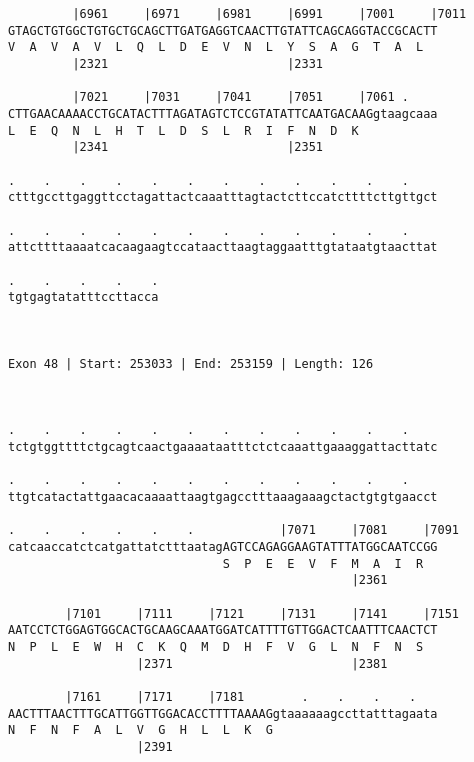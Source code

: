 \documentclass{article}
\begin{document}
\begin{Verbatim}
         |6961     |6971     |6981     |6991     |7001     |7011
GTAGCTGTGGCTGTGCTGCAGCTTGATGAGGTCAACTTGTATTCAGCAGGTACCGCACTT
V  A  V  A  V  L  Q  L  D  E  V  N  L  Y  S  A  G  T  A  L  
         |2321                         |2331                
  
         |7021     |7031     |7041     |7051     |7061 .    
CTTGAACAAAACCTGCATACTTTAGATAGTCTCCGTATATTCAATGACAAGgtaagcaaa
L  E  Q  N  L  H  T  L  D  S  L  R  I  F  N  D  K           
         |2341                         |2351                
  
.    .    .    .    .    .    .    .    .    .    .    .    
ctttgccttgaggttcctagattactcaaatttagtactcttccatcttttcttgttgct
                                                            
.    .    .    .    .    .    .    .    .    .    .    .    
attcttttaaaatcacaagaagtccataacttaagtaggaatttgtataatgtaacttat
                                                            
.    .    .    .    .
tgtgagtatatttccttacca
                     
                     
 
Exon 48 | Start: 253033 | End: 253159 | Length: 126



.    .    .    .    .    .    .    .    .    .    .    .    
tctgtggttttctgcagtcaactgaaaataatttctctcaaattgaaaggattacttatc
                                                            
.    .    .    .    .    .    .    .    .    .    .    .    
ttgtcatactattgaacacaaaattaagtgagcctttaaagaaagctactgtgtgaacct
                                                            
.    .    .    .    .    .            |7071     |7081     |7091
catcaaccatctcatgattatctttaatagAGTCCAGAGGAAGTATTTATGGCAATCCGG
                              S  P  E  E  V  F  M  A  I  R  
                                                |2361       
  
        |7101     |7111     |7121     |7131     |7141     |7151
AATCCTCTGGAGTGGCACTGCAAGCAAATGGATCATTTTGTTGGACTCAATTTCAACTCT
N  P  L  E  W  H  C  K  Q  M  D  H  F  V  G  L  N  F  N  S  
                  |2371                         |2381       
  
        |7161     |7171     |7181        .    .    .    .   
AACTTTAACTTTGCATTGGTTGGACACCTTTTAAAAGgtaaaaaagccttatttagaata
N  F  N  F  A  L  V  G  H  L  L  K  G                       
                  |2391                                     
  

\end{Verbatim}
\end{document}
